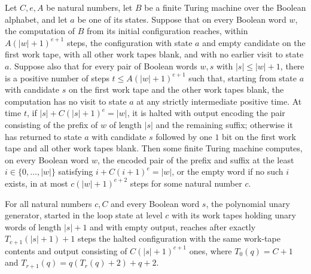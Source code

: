 \begin{lemma}
\label{Turing.FinTM.splitSolve_of_body}
\leanok
{}
Let $C,e,A$ be natural numbers, let $B$ be a finite Turing machine over the Boolean
alphabet, and let $a$ be one of its states. Suppose that on every Boolean word $w$, the
computation of $B$ from its initial configuration reaches, within $A(|w|+1)^{e+1}$
steps, the configuration with state $a$ and empty candidate on the first work tape, with
all other work tapes blank, and with no earlier visit to state $a$. Suppose also that
for every pair of Boolean words $w,s$ with $|s|\le |w|+1$, there is a positive number of
steps $t\le A(|w|+1)^{e+1}$ such that, starting from state $a$ with candidate $s$ on the
first work tape and the other work tapes blank, the computation has no visit to state
$a$ at any strictly intermediate positive time. At time $t$, if $|s|+C(|s|+1)^e=|w|$, it
is halted with output encoding the pair consisting of the prefix of $w$ of length $|s|$
and the remaining suffix; otherwise it has returned to state $a$ with candidate $s$
followed by one $1$ bit on the first work tape and all other work tapes blank. Then some
finite Turing machine computes, on every Boolean word $w$, the encoded pair of the
prefix and suffix at the least $i\in\{0,\ldots,|w|\}$ satisfying $i+C(i+1)^e=|w|$, or
the empty word if no such $i$ exists, in at most $c(|w|+1)^{e+2}$ steps for some natural
number $c$.
\end{lemma}

\begin{lemma}
\label{Turing.FinTM.splitSource_poly}
\leanok
{}
For all natural numbers $c,C$ and every Boolean word $s$, the polynomial unary
generator, started in the loop state at level $c$ with its work tapes holding unary
words of length $|s|+1$ and with empty output, reaches after exactly $T_{c+1}(|s|+1)+1$
steps the halted configuration with the same work-tape contents and output consisting of
$C(|s|+1)^{c+1}$ ones, where $T_0(q)=C+1$ and $T_{r+1}(q)=q(T_r(q)+2)+q+2$.
\end{lemma}

